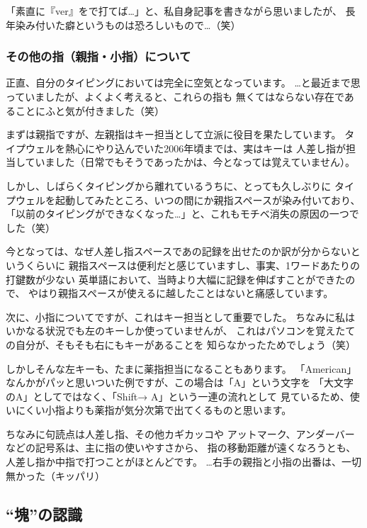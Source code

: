「素直に『ver』をで打てば…」と、私自身記事を書きながら思いましたが、
長年染み付いた癖というものは恐ろしいもので…（笑）


\subsubsection*{その他の指（親指・小指）について}

正直、自分のタイピングにおいては完全に空気となっています。
…と最近まで思っていましたが、よくよく考えると、これらの指も
無くてはならない存在であることにふと気が付きました（笑）

まずは親指ですが、左親指はキー担当として立派に役目を果たしています。
タイプウェルを熱心にやり込んでいた2006年頃までは、実はキーは
人差し指が担当していました（日常でもそうであったかは、今となっては覚えていません）。

しかし、しばらくタイピングから離れているうちに、とっても久しぶりに
タイプウェルを起動してみたところ、いつの間にか親指スペースが染み付いており、
「以前のタイピングができなくなった…」と、これもモチベ消失の原因の一つでした（笑）

今となっては、なぜ人差し指スペースであの記録を出せたのか訳が分からないというくらいに
親指スペースは便利だと感じていますし、事実、1ワードあたりの打鍵数が少ない
英単語において、当時より大幅に記録を伸ばすことができたので、
やはり親指スペースが使えるに越したことはないと痛感しています。


次に、小指についてですが、これはキー担当として重要でした。
ちなみに私はいかなる状況でも左のキーしか使っていませんが、
これはパソコンを覚えたての自分が、そもそも右にもキーがあることを
知らなかったためでしょう（笑）

しかしそんな左キーも、たまに薬指担当になることもあります。
「American」なんかがパッと思いついた例ですが、この場合は「A」という文字を
「大文字のA」としてではなく、「Shift→ A」という一連の流れとして
見ているため、使いにくい小指よりも薬指が気分次第で出てくるものと思います。


ちなみに句読点は人差し指、その他カギカッコや
アットマーク、アンダーバーなどの記号系は、主に指の使いやすさから、
指の移動距離が遠くなろうとも、人差し指か中指で打つことがほとんどです。
…右手の親指と小指の出番は、一切無かった（キッパリ）


\subsection{“塊”の認識}

